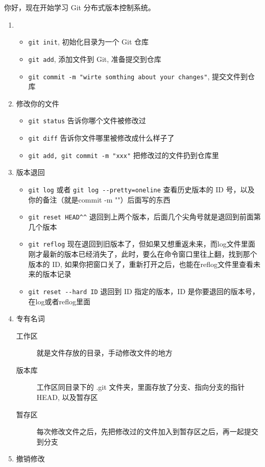 \documentclass[UTF8]{ctexart}
\begin{document}
你好，现在开始学习 Git 分布式版本控制系统。\par
\begin{enumerate}
  \item
  \begin{itemize}
    \item \verb|git init|, 初始化目录为一个 Git 仓库
    \item \verb|git add|, 添加文件到 Git, 准备提交到仓库
    \item \verb|git commit -m "wirte somthing about your changes"|, 提交文件到仓库
  \end{itemize}
  \item 修改你的文件
  \begin{itemize}
    \item \verb|git status| 告诉你哪个文件被修改过
    \item \verb|git diff| 告诉你文件哪里被修改成什么样子了
    \item \verb|git add, git commit -m "xxx"| 把修改过的文件扔到仓库里
  \end{itemize}
  \item 版本退回
  \begin{itemize}
    \item \verb|git log| 或者 \verb|git log --pretty=oneline| 查看历史版本的 ID 号，以及你的备注（就是commit -m ""）后面写的东西
    \item \verb|git reset HEAD^^| 退回到上两个版本，后面几个尖角号就是退回到前面第几个版本
    \item \verb|git reflog| 现在退回到旧版本了，但如果又想重返未来，而log文件里面刚才最新的版本已经消失了，此时，要么在命令窗口里往上翻，找到那个版本的 ID, 如果你把窗口关了，重新打开之后，也能在reflog文件里查看未来的版本记录
    \item \verb|git reset --hard ID| 退回到 ID 指定的版本，ID 是你要退回的版本号，在log或者reflog里面
  \end{itemize}
  \item 专有名词
  \begin{description}
    \item[工作区] 就是文件存放的目录，手动修改文件的地方
    \item[版本库] 工作区同目录下的 .git 文件夹，里面存放了分支、指向分支的指针 HEAD, 以及暂存区
    \item[暂存区] 每次修改文件之后，先把修改过的文件加入到暂存区之后，再一起提交到分支
  \end{description}
  \item 撤销修改
  \begin{itemize}

\end{itemize}
\end{enumerate}
\end{document}
